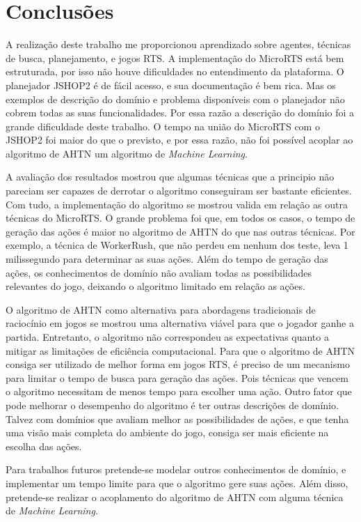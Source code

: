 
\chapter{\label{chap:concl}Conclusões}

A realização deste trabalho me proporcionou aprendizado sobre agentes, técnicas de busca, planejamento, e jogos RTS.
A implementação do MicroRTS está bem estruturada, por isso não houve dificuldades no entendimento da plataforma.
O planejador JSHOP2 é de fácil acesso, e sua documentação é bem rica.
Mas os exemplos de descrição do domínio e problema disponíveis com o planejador não cobrem todas as suas funcionalidades.
Por essa razão a descrição do domínio foi a grande dificuldade deste trabalho.
O tempo na união do MicroRTS com o JSHOP2 foi maior do que o previsto, e por essa razão, não foi possível acoplar ao algoritmo de AHTN um algoritmo de \textit{Machine Learning}.

A avaliação dos resultados mostrou que algumas técnicas que a principio não pareciam ser capazes de derrotar o algoritmo conseguiram ser bastante eficientes.
Com tudo, a implementação do algoritmo se mostrou valida em relação as outra técnicas do MicroRTS.
O grande problema foi que, em todos os casos, o tempo de geração das ações é maior no algoritmo de AHTN do que nas outras técnicas.
Por exemplo, a técnica de WorkerRush, que não perdeu em nenhum dos teste, leva 1 milissegundo para determinar as suas ações.
Além do tempo de geração das ações, os conhecimentos de domínio não avaliam todas as possibilidades relevantes do jogo, deixando o algoritmo limitado em relação as ações.

O algoritmo de AHTN como alternativa para abordagens tradicionais de raciocínio em jogos se mostrou uma alternativa viável para que o jogador ganhe a partida.
Entretanto, o algoritmo não correspondeu as expectativas quanto a mitigar as limitações de eficiência computacional.
Para que o algoritmo de AHTN consiga ser utilizado de melhor forma em jogos RTS, é preciso de um mecanismo para limitar o tempo de busca para geração das ações.
Pois técnicas que vencem o algoritmo necessitam de menos tempo para escolher uma ação.
Outro fator que pode melhorar o desempenho do algoritmo é ter outras descrições de domínio.
Talvez com domínios que avaliam melhor as possibilidades de ações, e que tenha uma visão mais completa do ambiente do jogo, consiga ser mais eficiente na escolha das ações. 

Para trabalhos futuros pretende-se modelar outros conhecimentos de domínio, e implementar um tempo limite para que o algoritmo gere suas ações. 
Além disso, pretende-se realizar o acoplamento do algoritmo de AHTN com alguma técnica de \textit{Machine Learning}. 
